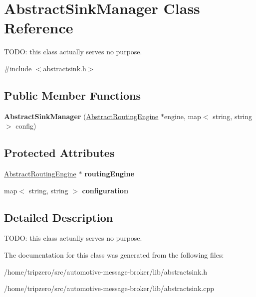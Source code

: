 \hypertarget{classAbstractSinkManager}{\section{Abstract\-Sink\-Manager Class Reference}
\label{classAbstractSinkManager}
}


T\-O\-D\-O\-: this class actually serves no purpose.  




{\ttfamily \#include $<$abstractsink.\-h$>$}

\subsection*{Public Member Functions}
\begin{DoxyCompactItemize}
\item 
\hypertarget{classAbstractSinkManager_a8c2b065455e7392bbef66056e492cf54}{{\bfseries Abstract\-Sink\-Manager} (\hyperlink{classAbstractRoutingEngine}{Abstract\-Routing\-Engine} $\ast$engine, map$<$ string, string $>$ config)}\label{classAbstractSinkManager_a8c2b065455e7392bbef66056e492cf54}

\end{DoxyCompactItemize}
\subsection*{Protected Attributes}
\begin{DoxyCompactItemize}
\item 
\hypertarget{classAbstractSinkManager_aa4951761c33e7012c3a0e72e099354b3}{\hyperlink{classAbstractRoutingEngine}{Abstract\-Routing\-Engine} $\ast$ {\bfseries routing\-Engine}}\label{classAbstractSinkManager_aa4951761c33e7012c3a0e72e099354b3}

\item 
\hypertarget{classAbstractSinkManager_ac329710da75b1c757584ec42a8072ea4}{map$<$ string, string $>$ {\bfseries configuration}}\label{classAbstractSinkManager_ac329710da75b1c757584ec42a8072ea4}

\end{DoxyCompactItemize}


\subsection{Detailed Description}
T\-O\-D\-O\-: this class actually serves no purpose. 

The documentation for this class was generated from the following files\-:\begin{DoxyCompactItemize}
\item 
/home/tripzero/src/automotive-\/message-\/broker/lib/abstractsink.\-h\item 
/home/tripzero/src/automotive-\/message-\/broker/lib/abstractsink.\-cpp\end{DoxyCompactItemize}
